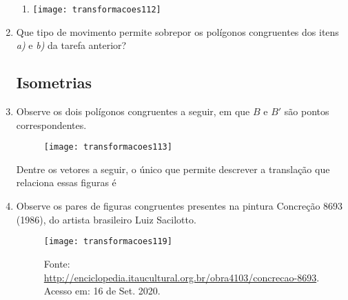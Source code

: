 \begin{enumerate}
\begin{enumerate}
\item {}
{
\texttt{[image: transformacoes112]}
}
\end{enumerate}
 

\item Que tipo de movimento permite sobrepor os polígonos congruentes dos itens \textit{a)} e \textit{b)} da tarefa anterior?

\subsection{Isometrias}

\item Observe os dois polígonos congruentes a seguir, em que $B$ e $B'$ são pontos correspondentes. 
 \begin{figure}[H]
 \centering
 
 \texttt{[image: transformacoes113]}
 \end{figure}

Dentre os vetores a seguir, o único que permite descrever a translação que relaciona essas figuras é
\begin{enumerate}[itemsep=1em]
\end{enumerate}
 

\item Observe os pares de figuras congruentes presentes na pintura Concreção 8693 (1986), do artista brasileiro Luiz Sacilotto.

 
\begin{figure}[H]
\centering

\texttt{[image: transformacoes119]}
\caption{Fonte: \url{http://enciclopedia.itaucultural.org.br/obra4103/concrecao-8693}. Acesso em: 16 de Set. 2020.}
\end{figure}


\end{enumerate}
